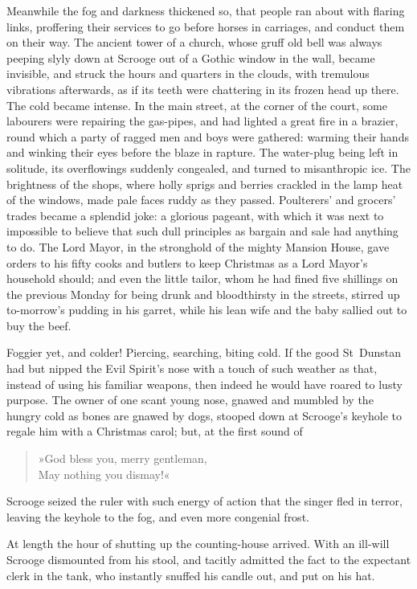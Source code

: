 Meanwhile the fog and darkness thickened so, that people ran about with flaring links, proffering their services to go before hors\-es in carriages, and conduct them on their way. The ancient tower of a church, whose gruff old bell was always peeping slyly down at Scrooge out of a Gothic window in the wall, became invisible, and struck the hours and quarters in the clouds, with tremulous vibrations afterwards, as if its teeth were chattering in its frozen head up there. The cold became intense. In the main street, at the corner of the court, some labourers were repairing the gas-pipes, and had lighted a great fire in a brazier, round which a party of ragged men and boys were gathered: warming their hands and winking their eyes before the blaze in rapture. The water-plug being left in solitude, its overflowings suddenly congealed, and turned to misanthropic ice. The brightness of the shops, where holly sprigs and berries crackled in the lamp heat of the windows, made pale faces ruddy as they passed. Poulterers' and grocers' trades became a splendid joke: a glorious pageant, with which it was next to impossible to believe that such dull principles as bargain and sale had anything to do. The Lord Mayor, in the stronghold of the mighty Mansion House, gave orders to his fifty cooks and butlers to keep Christmas as a Lord Mayor's household should; and even the little tailor, whom he had fined five shillings on the previous Monday for being drunk and bloodthirsty in the streets, stirred up to-morrow's pudding in his garret, while his lean wife and the baby sallied out to buy the beef.

Foggier yet, and colder! Piercing, searching, biting cold. If the good St~Dunstan had but nipped the Evil Spirit's nose with a touch of such weather as that, instead of using his familiar weapons, then indeed he would have roared to lusty purpose. The owner of one scant young nose, gnawed and mumbled by the hungry cold as bones are gnawed by dogs, stooped down at Scrooge's keyhole to regale him with a Christmas carol; but, at the first sound of 

\blockquote{»God bless you, merry gentleman,\\
May nothing you dismay!«}

\noindent Scrooge seized the ruler with such energy of action that the singer fled in terror, leaving the keyhole to the fog, and even more congenial frost.

At length the hour of shutting up the counting-house arrived. With an ill-will Scrooge dismounted from his stool, and tacitly admitted the fact to the expectant clerk in the tank, who instantly snuffed his candle out, and put on his hat.

